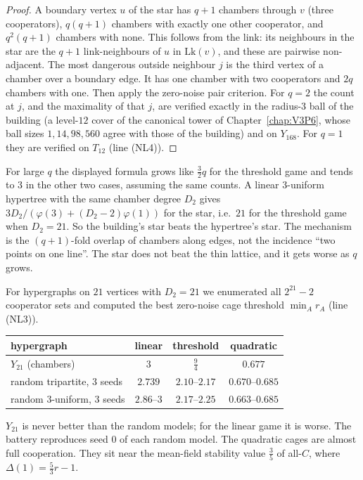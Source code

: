 \begin{proof}
A boundary vertex $u$ of the star has $q+1$ chambers through $v$ (three cooperators), $q(q+1)$
chambers with exactly one other cooperator, and $q^{2}(q+1)$ chambers with none. This follows from
the link: its neighbours in the star are the $q+1$ link-neighbours of $u$ in $\mathrm{Lk}(v)$, and
these are pairwise non-adjacent. The most dangerous outside neighbour $j$ is the third vertex of a
chamber over a boundary edge. It has one chamber with two cooperators and $2q$ chambers with one.
Then apply the zero-noise pair criterion. For $q=2$ the count at $j$, and the maximality of that
$j$, are verified exactly in the radius-$3$ ball of the building (a level-$12$ cover of the
canonical tower of Chapter~\ref{chap:V3P6}, whose ball sizes $1,14,98,560$ agree with those of the building) and
on $Y_{168}$. For $q=1$ they are verified on $T_{12}$ (line (NL4)).
\end{proof}

For large $q$ the displayed formula grows like $\frac32q$ for the threshold game and tends to $3$
in the other two cases, assuming the same counts. A linear $3$-uniform hypertree with the same
chamber degree $D_2$ gives $3D_2/(\varphi(3)+(D_2-2)\varphi(1))$ for the star, i.e.\ $21$ for the
threshold game when $D_2=21$. So the building's star beats the hypertree's star. The mechanism
is the $(q+1)$-fold overlap of chambers along edges, not the incidence ``two points on one line''.
The star does not beat the thin lattice, and it gets worse as $q$ grows.

\begin{remark}\label{V3P5:rem:exhaustive}
For hypergraphs on $21$ vertices with $D_2=21$ we enumerated all $2^{21}-2$ cooperator sets and
computed the best zero-noise cage threshold $\min_A r_A$ (line (NL3)).
\begin{center}
\small
\begin{tabular}{lccc}
\toprule
hypergraph & linear & threshold & quadratic\\
\midrule
$Y_{21}$ (chambers) & $3$ & $\frac94$ & $0.677$\\
random tripartite, $3$ seeds & $2.739$ & $2.10$--$2.17$ & $0.670$--$0.685$\\
random $3$-uniform, $3$ seeds & $2.86$--$3$ & $2.17$--$2.25$ & $0.663$--$0.685$\\
\bottomrule
\end{tabular}
\end{center}
$Y_{21}$ is never better than the random models; for the linear game it is worse. The battery
reproduces seed $0$ of each random model. The quadratic cages are almost full cooperation. They
sit near the mean-field stability value $\frac35$ of all-$C$, where $\Delta(1)=\frac53r-1$.
\end{remark}

